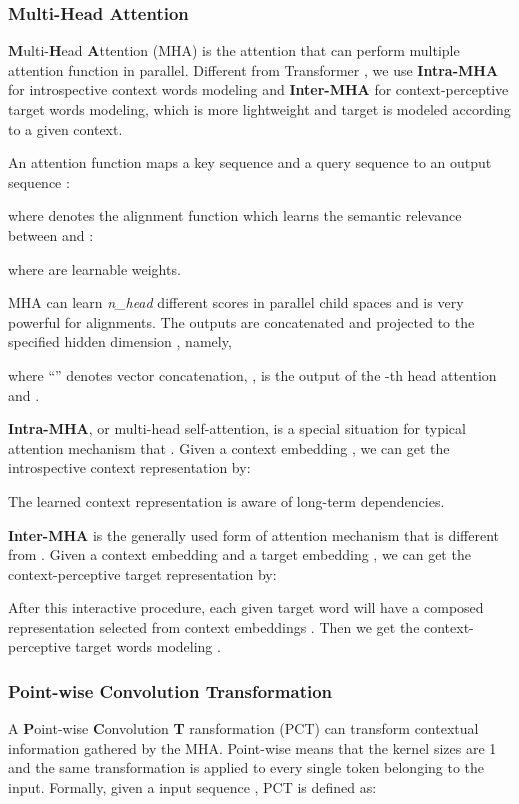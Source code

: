 \documentclass[11pt,a4paper]{article}
\begin{document}
\subsubsection{Multi-Head Attention} \label{sec:MHA}

\textbf{M}ulti-\textbf{H}ead \textbf{A}ttention (MHA) is the attention that can perform multiple attention function in parallel.
Different from Transformer \cite{vaswani2017attention}, we use \textbf{Intra-MHA} for introspective context words modeling
and \textbf{Inter-MHA} for context-perceptive target words modeling, which is more lightweight and target is modeled according to a given context.

An attention function maps a key sequence  and
a query sequence  to an output sequence :

where  denotes the alignment function which learns the semantic relevance between  and :

where  are learnable weights.

MHA can learn \emph{n\_head} different scores in parallel child spaces and is very powerful for alignments.
The  outputs are concatenated and projected to the specified hidden dimension , namely,

where ``'' denotes vector concatenation, ,
 is the output of the -th head attention and .


\textbf{Intra-MHA}, or multi-head self-attention,
is a special situation for typical attention mechanism that .
Given a context embedding , we can get the introspective context representation  by:

The learned context representation
 is aware of long-term dependencies.

\textbf{Inter-MHA} is the generally used form of attention mechanism that  is different from .
Given a context embedding  and a target embedding ,
we can get the context-perceptive target representation  by:


After this interactive procedure,
each given target word  will have a composed representation selected from context embeddings .
Then we get the context-perceptive target words modeling .

\subsubsection{Point-wise Convolution Transformation} \label{sec:PCT}

A \textbf{P}oint-wise \textbf{C}onvolution \textbf{T}
ransformation (PCT)
can transform contextual information gathered by the MHA.
Point-wise means that the kernel sizes are 1 and
the same transformation is applied to every single token belonging to the input.
Formally, given a input sequence , PCT is defined as:
\end{document}
